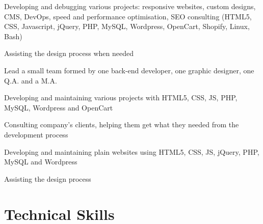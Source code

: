 \documentclass[letterpaper]{algo-resume}
\begin{document}
\begin{minipage}[t]{0.66\textwidth}
\begin{tightitemize}
\item Developing and debugging various projects: responsive websites, custom designs, CMS, DevOps, speed and performance optimisation, SEO consulting (HTML5, CSS, Javascript, jQuery, PHP, MySQL, Wordpress, OpenCart, Shopify, Linux, Bash)
\item Assisting the design process when needed

\end{tightitemize}

\sectionspace 



\begin{tightitemize}
\item Lead a small team formed by one back-end developer, one graphic designer, one Q.A. and a M.A.
\item Developing and maintaining various projects with HTML5, CSS, JS, PHP, MySQL, Wordpress and OpenCart

\end{tightitemize}

\sectionspace 



\begin{tightitemize}
\item Consulting company's clients, helping them get what they needed from the development process
\item Developing and maintaining plain websites using HTML5, CSS, JS, jQuery, PHP, MySQL and Wordpress
\item Assisting the design process

\end{tightitemize}

\sectionspace 




\section{Technical Skills} 


\end{minipage}
\end{document}
